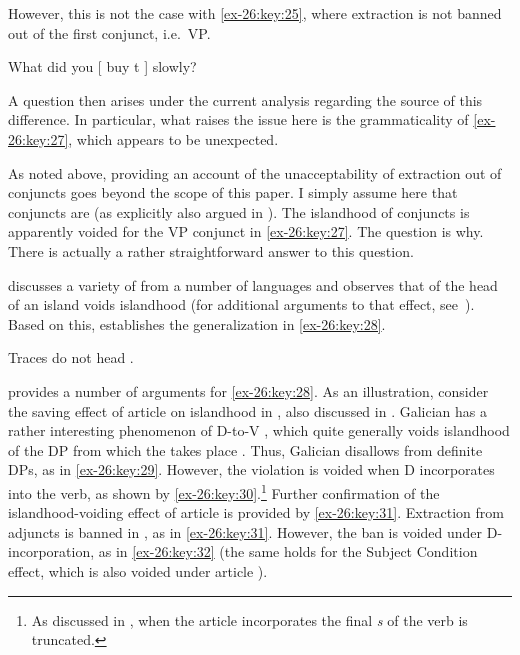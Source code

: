 \documentclass[output=paper]{langsci/langscibook}
\begin{document}
\ea\label{ex-26:key:26}
	\z
\z

However, this is not the case with \eqref{ex-26:key:25}, where extraction is not banned out of
the first conjunct, i.e.\ VP.

\ea\label{ex-26:key:27} What did you [ buy t ] slowly?
\z

A question then arises under the current analysis regarding the source of this
difference. In particular, what raises the issue here is the grammaticality of
\eqref{ex-26:key:27}, which appears to be unexpected.

As noted above, providing an account of the unacceptability of extraction out
of conjuncts goes beyond the scope of this paper. I simply assume here that
conjuncts are  (as explicitly also argued in \citealt{Odainpress}). The
islandhood of conjuncts is apparently voided for the VP conjunct in \eqref{ex-26:key:27}. The
question is why. There is actually a rather straightforward answer to this
question.

\textcite{Boskovic2011,Boskovic2013b} discusses a variety of  from a
number of languages and observes that  of the head of an island voids
islandhood (for additional arguments to that effect,
see~\citealt{Boskovic2015}). Based on this, \citeauthor{Boskovic2015}
establishes the generalization in \eqref{ex-26:key:28}.

\ea\label{ex-26:key:28} Traces do not head .
\z

\textcite{Boskovic2013b} provides a number of arguments for \eqref{ex-26:key:28}. As an
illustration, consider the saving effect of article  on islandhood
in , also discussed in \textcite{Uriagereka1988,Uriagereka1996}.
Galician has a rather interesting phenomenon of D-to-V , which
quite generally voids islandhood of the DP from which the  takes
place \parencite[see][]{Uriagereka1988,Uriagereka1996,Boskovic2013b}. Thus,
Galician disallows  from definite DPs, as in \eqref{ex-26:key:29}. However, the
violation is voided when D incorporates into the verb, as shown by
\eqref{ex-26:key:30}.\footnote{As discussed in \citet{Uriagereka1988}, when the article
incorporates the final \emph{s} of the verb is truncated.} Further confirmation
of the islandhood-voiding effect of article  is provided by \eqref{ex-26:key:31}.
Extraction from adjuncts is banned in , as in \eqref{ex-26:key:31}.  However, the ban
is voided under D-incorporation, as in \eqref{ex-26:key:32} (the same holds for the Subject
Condition effect, which is also voided under article ).
\end{document}
